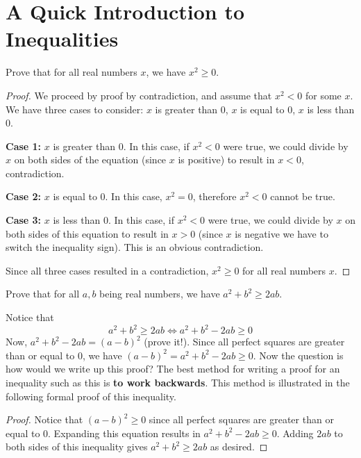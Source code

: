 \newpage

\section{A Quick Introduction to Inequalities}

\begin{exmp}  Prove that for all real numbers $x$, we have $x^2\ge 0$.  \end{exmp}
\begin{proof}  We proceed by proof by contradiction, and assume that $x^2<0$ for some $x$.  We have three cases to consider:  $x$ is greater than $0$, $x$ is equal to $0$, $x$ is less than $0$. 

\textbf{Case 1:}    $x$ is greater than $0$.  In this case, if $x^2<0$ were true, we could divide by $x$ on both sides of the equation (since $x$ is positive) to result in $x<0$, contradiction.  

\textbf{Case 2:}  $x$ is equal to $0$.  In this case, $x^2=0$, therefore $x^2<0$ cannot be true.

\textbf{Case 3:}  $x$ is less than $0$.  In this case, if $x^2<0$ were true, we could divide by $x$ on both sides of this equation to result in $x>0$ (since $x$ is negative we have to switch the inequality sign).  This is an obvious contradiction.  

Since all three cases resulted in a contradiction, $x^2\ge 0$ for all real numbers $x$.  \end{proof}
\begin{exmp}  Prove that for all $a,b$ being real numbers, we have $a^2+b^2\ge 2ab$.  \end{exmp}
\begin{soln}  Notice that $$a^2+b^2\ge 2ab \iff a^2+b^2-2ab\ge 0$$
Now, $a^2+b^2-2ab=\left(a-b\right)^2$ (prove it!).  Since all perfect squares are greater than or equal to $0$, we have $\left(a-b\right)^2=a^2+b^2-2ab\ge 0$.  Now the question is how would we write up this proof?  The best method for writing a proof for an inequality such as this is \textbf{to work backwards}. This method is illustrated in the following formal proof of this inequality. \end{soln}
\begin{proof}  Notice that $\left(a-b\right)^2\ge 0$ since all perfect squares are greater than or equal to $0$.  Expanding this equation results in $a^2+b^2-2ab\ge 0$.  Adding $2ab$ to both sides of this inequality gives $a^2+b^2\ge 2ab$ as desired.  \end{proof}



